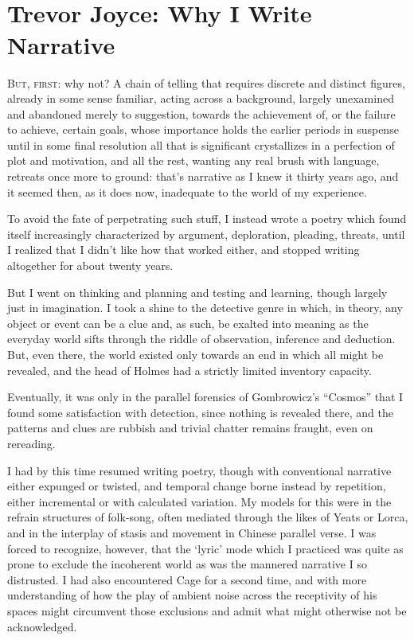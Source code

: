 \documentclass[
]{memoir}
\begin{document}
~

~

\hypertarget{trevor-joyce-why-i-write-narrative}{%
\chapter{Trevor Joyce: Why I Write
Narrative}\label{trevor-joyce-why-i-write-narrative}}

\lettrine[lines=3, findent=0em, nindent=0.1em, lhang=0]{B}{ut, first}:
why not? A chain of telling that requires discrete and distinct figures,
already in some sense familiar, acting across a background, largely
unexamined and abandoned merely to suggestion, towards the achievement
of, or the failure to achieve, certain goals, whose importance holds the
earlier periods in suspense until in some final resolution all that is
significant crystallizes in a perfection of plot and motivation, and all
the rest, wanting any real brush with language, retreats once more to
ground: that's narrative as I knew it thirty years ago, and it seemed
then, as it does now, inadequate to the world of my experience.

To avoid the fate of perpetrating such stuff, I instead wrote a poetry
which found itself increasingly characterized by argument, deploration,
pleading, threats, until I realized that I didn't like how that worked
either, and stopped writing altogether for about twenty years.

But I went on thinking and planning and testing and learning, though
largely just in imagination. I took a shine to the detective genre in
which, in theory, any object or event can be a clue and, as such, be
exalted into meaning as the everyday world sifts through the riddle of
observation, inference and deduction. But, even there, the world existed
only towards an end in which all might be revealed, and the head of
Holmes had a strictly limited inventory capacity.

Eventually, it was only in the parallel forensics of Gombrowicz's
``Cosmos'' that I found some satisfaction with detection, since nothing
is revealed there, and the patterns and clues are rubbish and trivial
chatter remains fraught, even on rereading.

I had by this time resumed writing poetry, though with conventional
narrative either expunged or twisted, and temporal change borne instead
by repetition, either incremental or with calculated variation. My
models for this were in the refrain structures of folk-song, often
mediated through the likes of Yeats or Lorca, and in the interplay of
stasis and movement in Chinese parallel verse. I was forced to
recognize, however, that the `lyric' mode which I practiced was quite as
prone to exclude the incoherent world as was the mannered narrative I so
distrusted. I had also encountered Cage for a second time, and with more
understanding of how the play of ambient noise across the receptivity of
his spaces might circumvent those exclusions and admit what might
otherwise not be acknowledged.
\end{document}
